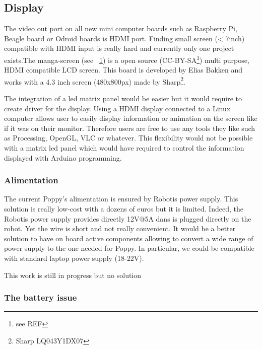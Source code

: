 \subsection{Display} %

The video out port on all new mini computer boards such as Raspberry Pi, Beagle board or Odroid boards is HDMI port. Finding small screen (< 7inch) compatible with HDMI input is really hard and currently only one project exists.The manga-screen (see \figurename~\ref{fig:manga-screen}) is a open source (CC-BY-SA\footnote{see REF}) multi purpose, HDMI compatible LCD screen. This board is developed by Elias Bakken and works with a 4.3 inch screen (480x800px) made by Sharp\footnote{Sharp LQ043Y1DX07}.

\begin{figure}[h]
\centering
    \hfil
    \caption{}
    \label{fig:manga-screen}
\end{figure}

The integration of a led matrix panel would be easier but it would require to create driver for the display.
Using a HDMI display connected to a Linux computer allows user to easily display information or animation on the screen like if it was on their monitor. Therefore users are free to use any tools they like such as Processing, OpenGL, VLC or whatever. This flexibility would not be possible with a matrix led panel which would have required to control the information displayed with Arduino programming.

\subsubsection{Alimentation} %
\label{ssub:alimentation}

The current Poppy's alimentation is ensured by Robotis power supply. This solution is really low-cost with a dozens of euros but it is limited. Indeed, the Robotis power supply provides directly 12V@5A dans is plugged directly on the robot. Yet the wire is short and not really convenient. It would be a better solution to have on board active components allowing to convert a wide range of power supply to the one needed for Poppy. In particular, we could be compatible with standard laptop power supply (18-22V).

This work is still in progress but no solution


\subsubsection{The battery issue} %

